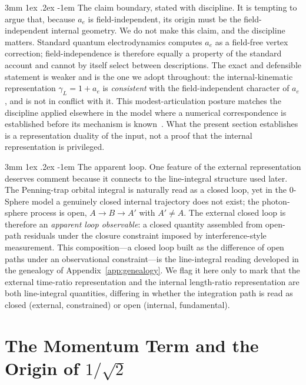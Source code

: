 \documentclass[%
 reprint, amsmath,amssymb, aps, prb, ]{revtex4-2}
\makeatletter
\numberwithin{equation}{section}
\renewcommand\paragraph{%
  \@startsection{paragraph}{4}{\z@}%
    {3mm \@plus 1ex \@minus .2ex}%
    {-1em}%
    {\normalfont\normalsize\itshape}}
\makeatother
\begin{document}
\paragraph{The claim boundary, stated with discipline.}
It is tempting to argue that, because $a_e$ is field-independent, its origin must be the field-independent internal geometry. We do not make this claim, and the discipline matters. Standard quantum electrodynamics computes $a_e$ as a field-free vertex correction; field-independence is therefore equally a property of the standard account and cannot by itself select between descriptions. The exact and defensible statement is weaker and is the one we adopt throughout: the internal-kinematic representation $\gamma_L = 1 + a_e$ is \emph{consistent} with the field-independent character of $a_e$, and is not in conflict with it. This modest-articulation posture matches the discipline applied elsewhere in the model where a numerical correspondence is established before its mechanism is known~\cite{hanamura28}. What the present section establishes is a representation duality of the input, not a proof that the internal representation is privileged.

\paragraph{The apparent loop.}
One feature of the external representation deserves comment because it connects to the line-integral structure used later. The Penning-trap orbital integral is naturally read as a closed loop, yet in the 0-Sphere model a genuinely closed internal trajectory does not exist; the photon-sphere process is open, $A \to B \to A'$ with $A' \neq A$. The external closed loop is therefore an \emph{apparent loop observable}: a closed quantity assembled from open-path residuals under the closure constraint imposed by interference-style measurement. This composition---a closed loop built as the difference of open paths under an observational constraint---is the line-integral reading developed in the genealogy of Appendix~\ref{app:genealogy}. We flag it here only to mark that the external time-ratio representation and the internal length-ratio representation are both line-integral quantities, differing in whether the integration path is read as closed (external, constrained) or open (internal, fundamental).

\section{The Momentum Term and the Origin of \texorpdfstring{$1/\sqrt{2}$}{1/sqrt2}}
\label{sec:momentum}
\end{document}
